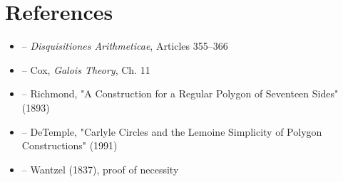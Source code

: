 \section{References}

\begin{itemize}
    \item \cite{gauss-disq} -- \textit{Disquisitiones Arithmeticae}, Articles 355--366
    \item \cite{cox-galois} -- Cox, \textit{Galois Theory}, Ch. 11
    \item \cite{richmond-construction} -- Richmond, "A Construction for a Regular Polygon of Seventeen Sides" (1893)
    \item \cite{de-temple} -- DeTemple, "Carlyle Circles and the Lemoine Simplicity of Polygon Constructions" (1991)
    \item \cite{wantzel} -- Wantzel (1837), proof of necessity
\end{itemize}